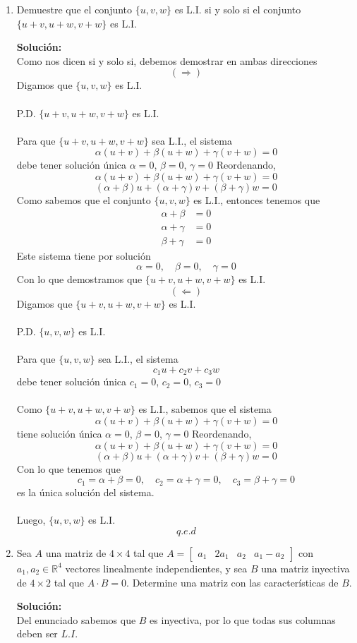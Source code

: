 \documentclass[12pt]{article}
\newenvironment{solucion}
{\begin{mdframed}[backgroundcolor=black!10]
		{\bf Solución:}\\
	}
	{
	\end{mdframed}
}
\newenvironment{preguntas}
{\begin{enumerate}\itemsep12pt
	}
	{
	\end{enumerate}
}
\newcommand{\R}{\mathbb{R}}
\begin{document}
\begin{preguntas}
\item Demuestre que el conjunto $\{u, v, w\}$ es L.I. si y solo si el conjunto $\{u+v, u+w, v+w\}$ es L.I.
\begin{solucion}
Como nos dicen si y solo si, debemos demostrar en ambas direcciones
		$$(\Longrightarrow)$$
		Digamos que $\{u, v, w\}$ es L.I.\\
		\\
		P.D. $\{u+v, u+w, v+w\}$ es L.I.\\
		\\
		Para que $\{u+v, u+w, v+w\}$ sea L.I., el sistema
		$$\alpha (u+v) + \beta (u+w) + \gamma (v+w) = 0$$
		debe tener solución única $\alpha = 0$, $\beta = 0$, $\gamma = 0$
		Reordenando,
		$$\alpha (u+v) + \beta (u+w) + \gamma (v+w) = 0$$
		$$(\alpha + \beta) u + (\alpha + \gamma) v + (\beta + \gamma) w = 0$$
		Como sabemos que el conjunto $\{u, v, w\}$ es L.I., entonces tenemos que
		$$\begin{array}{rl}
		\alpha + \beta & = 0\\
		\alpha + \gamma & = 0\\
		\beta + \gamma & = 0
		\end{array}$$
		Este sistema tiene por solución
		$$\alpha = 0, \quad \beta = 0, \quad \gamma = 0$$
		Con lo que demostramos que $\{u+v, u+w, v+w\}$ es L.I.
		$$(\Longleftarrow)$$
		Digamos que $\{u+v, u+w, v+w\}$ es L.I.\\
		\\
		P.D. $\{u, v, w\}$ es L.I.\\
		\\
		Para que $\{u, v, w\}$ sea L.I., el sistema
		$$c_1u + c_2v + c_3w$$
		debe tener solución única $c_1 = 0$, $c_2 = 0$, $c_3 = 0$\\
		\\
		Como $\{u+v, u+w, v+w\}$ es L.I., sabemos que el sistema
		$$\alpha (u+v) + \beta (u+w) + \gamma (v+w) = 0$$
		tiene solución única $\alpha = 0$, $\beta = 0$, $\gamma = 0$
		Reordenando,
		$$\alpha (u+v) + \beta (u+w) + \gamma (v+w) = 0$$
		$$(\alpha + \beta) u + (\alpha + \gamma) v + (\beta + \gamma) w = 0$$
		Con lo que tenemos que
		$$c_1 = \alpha + \beta = 0, \quad c_2 = \alpha + \gamma = 0, \quad c_3 = \beta + \gamma = 0$$
		es la única solución del sistema. \\
		\\
		Luego, $\{u, v, w\}$ es L.I.
		$$q.e.d$$
\end{solucion}
\item Sea $A$ una matriz de $4 \times 4$ tal que $A=\begin{bmatrix}a_1 & 2a_1 & a_2 & a_1-a_2\end{bmatrix}$ con $a_1, a_2 \in \R^4$ vectores linealmente independientes, y sea $B$ una matriz inyectiva de $4 \times 2$ tal que $A \cdot B = 0$. Determine una matriz con las características de $B$.
\begin{solucion}
Del enunciado sabemos que $B$ es inyectiva, por lo que todas sus columnas deben ser $L.I.$\\


\end{solucion}
\end{preguntas}
\end{document}
